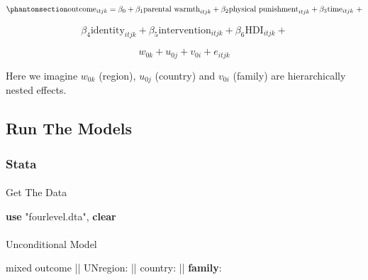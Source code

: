 \documentclass[
  letterpaper,
  DIV=11,
  numbers=noendperiod]{scrreprt}
\makeatletter
\let\oldparagraph\paragraph
\renewcommand{\paragraph}{
    \@ifstar
      \xxxParagraphStar
      \xxxParagraphNoStar
  }
\newcommand{\xxxParagraphStar}[1]{\oldparagraph*{#1}\mbox{}}
\newcommand{\xxxParagraphNoStar}[1]{\oldparagraph{#1}\mbox{}}
\newenvironment{Shaded}{\begin{snugshade}}{\end{snugshade}}
\newcommand{\KeywordTok}[1]{\textcolor[rgb]{0.00,0.23,0.31}{\textbf{#1}}}
\newcommand{\NormalTok}[1]{\textcolor[rgb]{0.00,0.23,0.31}{#1}}
\newcommand{\StringTok}[1]{\textcolor[rgb]{0.13,0.47,0.30}{#1}}
\makeatother
\begin{document}
\begin{equation}\phantomsection\label{eq-MLM-fourlevel-multilingual}{\text{outcome}_{itjk} = \beta_0 + \beta_1 \text{parental warmth}_{itjk} + \beta_2 \text{physical punishment}_{itjk} + \beta_3 \text{time}_{itjk} \ + }\end{equation}

\[\beta_4 \text{identity}_{itjk} + \beta_5 \text{intervention}_{itjk} + \beta_6 \text{HDI}_{itjk} +\]

\[w_{0k} + u_{0j} + v_{0i} + e_{itjk}\]

Here we imagine \(w_{0k}\) (region), \(u_{0j}\) (country) and \(v_{0i}\)
(family) are hierarchically nested effects.

\subsection{Run The Models}\label{run-the-models-5}

\subsubsection{Stata}

\paragraph{Get The Data}\label{get-the-data-8}

\begin{Shaded}
\begin{Highlighting}[]

\KeywordTok{use} \StringTok{"fourlevel.dta"}\NormalTok{, }\KeywordTok{clear}
\end{Highlighting}
\end{Shaded}

\paragraph{Unconditional Model}\label{unconditional-model}

\begin{Shaded}
\begin{Highlighting}[]

\NormalTok{mixed outcome || UNregion: || country: || }\KeywordTok{family}\NormalTok{:}
\end{Highlighting}
\end{Shaded}
\end{document}
